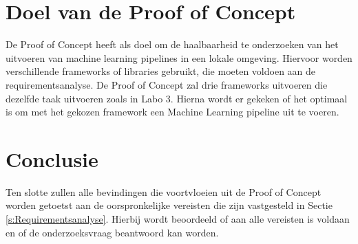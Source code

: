 \section{Doel van de Proof of Concept}
De Proof of Concept heeft als doel om de haalbaarheid te onderzoeken van het uitvoeren van machine learning pipelines in een lokale omgeving. Hiervoor worden verschillende frameworks of libraries gebruikt, die moeten voldoen aan de requirementsanalyse. De Proof of Concept zal drie frameworks uitvoeren die dezelfde taak uitvoeren zoals in Labo 3. Hierna wordt er gekeken of het optimaal is om met het gekozen framework een Machine Learning pipeline uit te voeren.
\section{Conclusie}
Ten slotte zullen alle bevindingen die voortvloeien uit de Proof of Concept worden getoetst aan de oorspronkelijke vereisten die zijn vastgesteld in Sectie \ref{s:Requirementsanalyse}. Hierbij wordt beoordeeld of aan alle vereisten is voldaan en of de onderzoeksvraag beantwoord kan worden.

